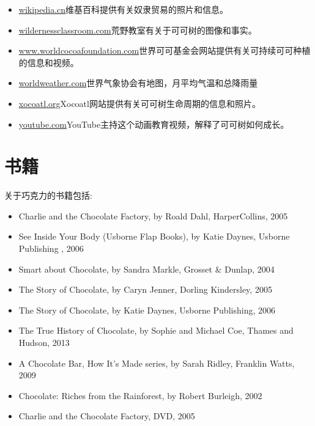 \begin{itemize}
  \item \href{https://en.wikipedia.org/wiki/Atlantic_slave_trade}{wikipedia.cn}维基百科提供有关奴隶贸易的照片和信息。
  \item \href{http://www.wildernessclassroom.com/students/archives/2006/03/chocolate_treec.html}{wildernessclassroom.com}荒野教室有关于可可树的图像和事实。
  \item \href{http://www.worldcocoafoundation.org}{www.worldcocoafoundation.com}世界可可基金会网站提供有关可持续可可种植的信息和视频。
  \item \href{http://worldweather.wmo.int/index.htm}{worldweather.com}世界气象协会有地图，月平均气温和总降雨量
  \item \href{http://www.xocoatl.org/tree.htm}{xocoatl.org}Xocoatl网站提供有关可可树生命周期的信息和照片。
  \item \href{https://www.youtube.com/watch?v=LJ-1snuKJ7o}{youtube.com}YouTube主持这个动画教育视频，解释了可可树如何成长。
\end{itemize}



\section{书籍}
关于巧克力的书籍包括:\par
\begin{itemize}
  \item Charlie and the Chocolate Factory, by Roald Dahl, HarperCollins, 2005
  \item See Inside Your Body (Usborne Flap Books), by Katie Daynes, Usborne Publishing , 2006
  \item Smart about Chocolate, by Sandra Markle, Grosset & Dunlap, 2004 
  \item The Story of Chocolate, by Caryn Jenner, Dorling Kindersley, 2005 
  \item The Story of Chocolate, by Katie Daynes, Usborne Publishing, 2006
  \item The True History of Chocolate, by Sophie and Michael Coe, Thames and Hudson, 2013 
  \item A Chocolate Bar, How It’s Made series, by Sarah Ridley, Franklin Watts, 2009 
  \item Chocolate: Riches from the Rainforest, by Robert Burleigh, 2002
  \item Charlie and the Chocolate Factory, DVD, 2005
\end{itemize}
